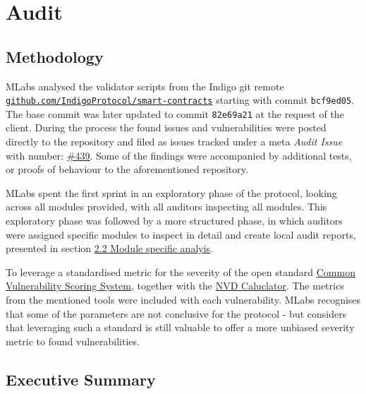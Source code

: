 \usepackage{listings}
\chapter{Audit}

\section{Methodology}

MLabs analysed the validator scripts from the Indigo git remote
\href{https://github.com/IndigoProtocol/smart-contracts}{\texttt{github.com/IndigoProtocol/smart-contracts}}
starting with commit \texttt{bcf9ed05}.  The base commit was later updated to
commit \texttt{82e69a21} at the request of the client. During the process the
found issues and vulnerabilities were posted directly to the repository and
filed as issues tracked under a meta \emph{Audit Issue} with number:
\href{https://github.com/IndigoProtocol/smart-contracts/issues/439}{\#439}.
Some of the findings were accompanied by additional tests, or proofs of
behaviour to the aforementioned repository.

MLabs spent the first sprint in an exploratory phase of the protocol,
looking across all modules provided, with all auditors inspecting all
modules. This exploratory phase was followed by a more structured phase,
in which auditors were assigned specific modules to inspect in detail
and create local audit reports, presented in section
\protect\hyperlink{22-module-specific-analyis}{2.2 Module specific
analyis}.

To leverage a standardised metric for the severity of the open standard
\href{https://www.first.org/cvss/}{Common Vulnerability Scoring System},
together with the
\href{https://nvd.nist.gov/vuln-metrics/cvss/v3-calculator}{NVD
Caluclator}. The metrics from the mentioned tools were included with
each vulnerability. MLabs recognises that some of the parameters are not
conclusive for the protocol - but considers that leveraging such a
standard is still valuable to offer a more unbiased severity metric to
found vulnerabilities.

\section{Executive Summary}


